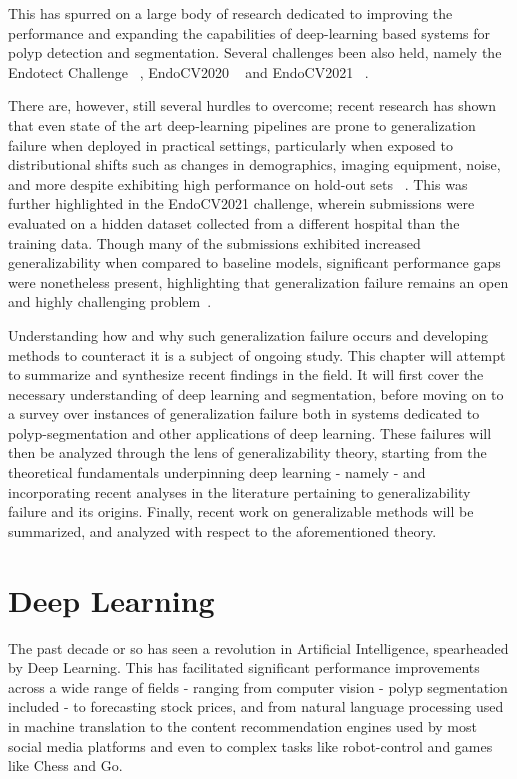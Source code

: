This has spurred on a large body of research dedicated to improving the performance and expanding the capabilities of deep-learning based systems for polyp detection and segmentation. Several challenges been also held, namely the Endotect Challenge ~\cite{endotect}, EndoCV2020 ~\cite{endocv2020} and EndoCV2021 ~\cite{endocv2021}.

There are, however, still several hurdles to overcome; recent research has shown that even state of the art deep-learning pipelines are prone to generalization failure when deployed in practical settings, particularly when exposed to distributional shifts such as changes in demographics, imaging equipment, noise, and more despite exhibiting high performance on hold-out sets ~\cite{retinopathy, damour2020underspecification, pneumonia, shortcut_learning}. This was further highlighted in the EndoCV2021 challenge, wherein submissions were evaluated on a hidden dataset collected from a different hospital than the training data. Though many of the submissions exhibited increased generalizability when compared to baseline models, significant performance gaps were nonetheless present, highlighting that generalization failure remains an open and highly challenging problem~\cite{endocv2021}. 

Understanding how and why such generalization failure occurs and developing methods to counteract it is a subject of ongoing study. This chapter will attempt to summarize and synthesize recent findings in the field. It will first cover the necessary understanding of deep learning and segmentation, before moving on to a survey over instances of generalization failure both in systems dedicated to polyp-segmentation and other applications of deep learning. These failures will then be analyzed through the lens of generalizability theory, starting from the theoretical fundamentals underpinning deep learning - namely  - and incorporating recent analyses in the literature pertaining to generalizability failure and its origins. Finally, recent work on generalizable methods will be summarized, and analyzed with respect to the aforementioned theory. 
	
\section{Deep Learning}
The past decade or so has seen a revolution in Artificial Intelligence, spearheaded by Deep Learning. This has facilitated significant performance improvements across a wide range of fields - ranging from computer vision \cite{computer_vision} - polyp segmentation included - to forecasting stock prices, and from natural language processing used in machine translation to the content recommendation engines used by most social media platforms and even to complex tasks like robot-control and games like Chess and Go. 

